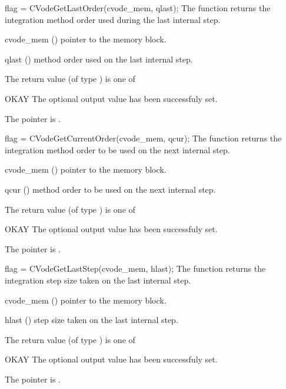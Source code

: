{
  flag = CVodeGetLastOrder(cvode\_mem, qlast);
}
{
  The function  returns the
  integration method order used during the last internal step.
}
{
  \begin{args}
  \item[cvode\_mem] ()
    pointer to the {\cvodes} memory block.
  \item[qlast] ()
    method order used on the last internal step.
  \end{args}
}
{
  The return value  (of type ) is one of
  \begin{args}
  \item[OKAY] 
    The optional output value has been successfuly set.
  \item[\Id{CVG\_NO\_MEM}]
    The  pointer is .
  \end{args}
}
{}
{
  flag = CVodeGetCurrentOrder(cvode\_mem, qcur);
}
{
  The function  returns the
  integration method order to be used on the next internal step.
}
{
  \begin{args}
  \item[cvode\_mem] ()
    pointer to the {\cvodes} memory block.
  \item[qcur] ()
    method order to be used on the next internal step.
  \end{args}
}
{
  The return value  (of type ) is one of
  \begin{args}
  \item[OKAY] 
    The optional output value has been successfuly set.
  \item[\Id{CVG\_NO\_MEM}]
    The  pointer is .
  \end{args}
}
{}
{
  flag = CVodeGetLastStep(cvode\_mem, hlast);
}
{
  The function  returns the
  integration step size taken on the last internal step.
}
{
  \begin{args}
  \item[cvode\_mem] ()
    pointer to the {\cvodes} memory block.
  \item[hlast] ()
    step size taken on the last internal step.
  \end{args}
}
{
  The return value  (of type ) is one of
  \begin{args}
  \item[OKAY] 
    The optional output value has been successfuly set.
  \item[\Id{CVG\_NO\_MEM}]
    The  pointer is .
  \end{args}
}

